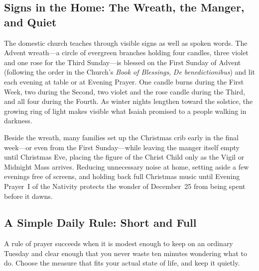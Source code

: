 \subsection{Signs in the Home: The Wreath, the Manger, and Quiet}

The domestic church teaches through visible signs as well as spoken words. The Advent wreath---a circle of evergreen branches holding four candles, three violet and one rose for the Third Sunday---is blessed on the First Sunday of Advent (following the order in the Church's \textit{Book of Blessings}, \textit{De benedictionibus}) and lit each evening at table or at Evening Prayer. One candle burns during the First Week, two during the Second, two violet and the rose candle during the Third, and all four during the Fourth. As winter nights lengthen toward the solstice, the growing ring of light makes visible what Isaiah promised to a people walking in darkness.

Beside the wreath, many families set up the Christmas crib early in the final week---or even from the First Sunday---while leaving the manger itself empty until Christmas Eve, placing the figure of the Christ Child only as the Vigil or Midnight Mass arrives. Reducing unnecessary noise at home, setting aside a few evenings free of screens, and holding back full Christmas music until Evening Prayer~I of the Nativity protects the wonder of December~25 from being spent before it dawns.

\subsection{A Simple Daily Rule: Short and Full}

A rule of prayer succeeds when it is modest enough to keep on an ordinary Tuesday and clear enough that you never waste ten minutes wondering what to do. Choose the measure that fits your actual state of life, and keep it quietly.

